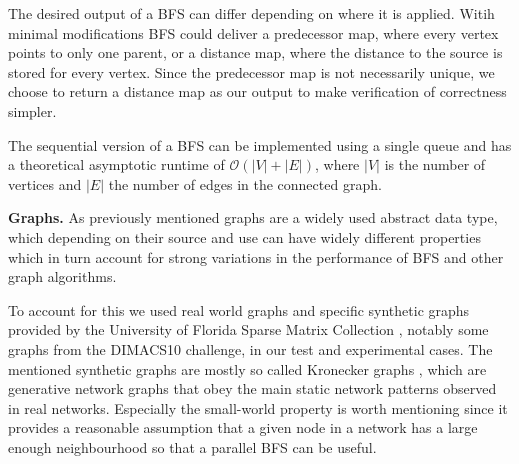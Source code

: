 \documentclass[letterpaper]{article}
\newcommand{\mypar}[1]{{\bf #1.}} %
\begin{document}
	The desired output of a BFS can differ depending on where it is applied. Witih minimal modifications BFS could deliver a predecessor map, where every vertex points to only one parent, or a distance map, where the distance to the source is stored for every vertex. Since the predecessor map is not necessarily unique, we choose to return a distance map as our output to make verification of correctness simpler.  
	
	The sequential version of a BFS can be implemented using a single queue and has a theoretical asymptotic runtime of $\mathcal{O}(\lvert V\rvert + \lvert E\rvert )$, where $\lvert V\rvert$ is the number of vertices and $\lvert E\rvert$ the number of edges in the connected graph.
	
	
	\mypar{Graphs}
	As previously mentioned graphs are a widely used abstract data type, which depending on their source and use can have widely different properties which in turn account for strong variations in the performance of BFS and other graph algorithms.
	
	To account for this we used real world graphs and specific synthetic graphs provided by the University of Florida Sparse Matrix Collection \cite{SparseMatrixCollection}, notably some graphs from the DIMACS10 challenge, in our test and experimental cases.
	The mentioned synthetic graphs are mostly so called Kronecker graphs \cite{Leskovec:2010:KGA:1756006.1756039}, which are generative network graphs that obey the main static network patterns observed in real networks.
	Especially the small-world property is worth mentioning since it provides a reasonable assumption that a given node in a network has a large enough neighbourhood so that a parallel BFS can be useful.
	
	
\end{document}
